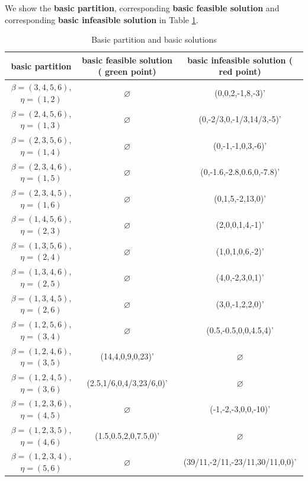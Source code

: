 
We show the \textbf{basic partition}, corresponding \textbf{basic feasible solution} and corresponding \textbf{basic infeasible solution} in Table \ref{tab:par-sol}.

\begin{table}[!h]
\centering
\small
\begin{tabular}{|c|c|c|}\hline

\textbf{basic partition} & \textbf{basic feasible solution} ({\color{green} green} point) & \textbf{basic infeasible solution} ({\color{red} red} point) \\\hline\hline
$\beta = (3,4,5,6) $, $\eta = (1,2)$ & $\varnothing$ & (0,0,2,-1,8,-3)' \\\hline
$\beta = (2,4,5,6) $, $\eta = (1,3)$ & $\varnothing$ & (0,-2/3,0,-1/3,14/3,-5)' \\\hline
$\beta = (2,3,5,6) $, $\eta = (1,4)$ & $\varnothing$ & (0,-1,-1,0,3,-6)' \\\hline
$\beta = (2,3,4,6) $, $\eta = (1,5)$ & $\varnothing$ & (0,-1.6,-2.8,0.6,0,-7.8)' \\\hline
$\beta = (2,3,4,5) $, $\eta = (1,6)$ & $\varnothing$ & (0,1,5,-2,13,0)' \\\hline
$\beta = (1,4,5,6) $, $\eta = (2,3)$ & $\varnothing$ & (2,0,0,1,4,-1)' \\\hline
$\beta = (1,3,5,6) $, $\eta = (2,4)$ & $\varnothing$ & (1,0,1,0,6,-2)'\\\hline
$\beta = (1,3,4,6) $, $\eta = (2,5)$ & $\varnothing$ & (4,0,-2,3,0,1)'\\\hline
$\beta = (1,3,4,5) $, $\eta = (2,6)$ & $\varnothing$ & (3,0,-1,2,2,0)'\\\hline
$\beta = (1,2,5,6) $, $\eta = (3,4)$ & $\varnothing$ & (0.5,-0.5,0,0,4.5,4)' \\\hline
$\beta = (1,2,4,6) $, $\eta = (3,5)$ & (14,4,0,9,0,23)' & $\varnothing$ \\\hline
$\beta = (1,2,4,5) $, $\eta = (3,6)$ & (2.5,1/6,0,4/3,23/6,0)' & $\varnothing$ \\\hline
$\beta = (1,2,3,6) $, $\eta = (4,5)$ & $\varnothing$ & (-1,-2,-3,0,0,-10)' \\\hline
$\beta = (1,2,3,5) $, $\eta = (4,6)$ & (1.5,0.5,2,0,7.5,0)' & $\varnothing$ \\\hline
$\beta = (1,2,3,4) $, $\eta = (5,6)$ & $\varnothing$ & (39/11,-2/11,-23/11,30/11,0,0)' \\\hline

\end{tabular}
\caption{Basic partition and basic solutions}
\label{tab:par-sol}
\end{table}

